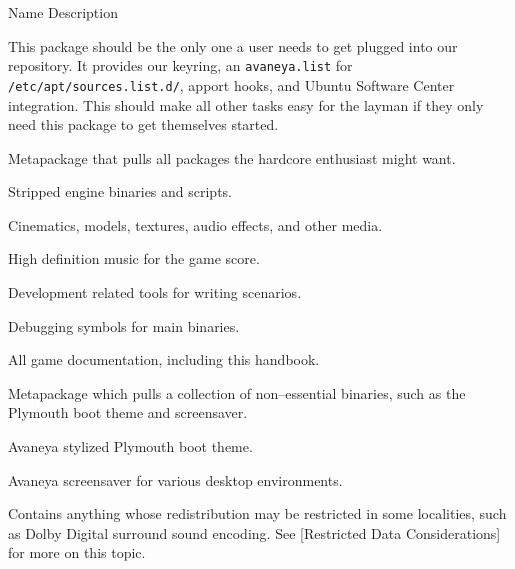 {
    \bTABLE[split=repeat,option=stretch]
    \setupTABLE[column][2]
        [width=.65\textwidth,
        align=yes]
    \setupTABLE[row][each][align=center]
    \setupTABLE[7][1][align=center]

\bTABLEhead
    \bTR[bottomframe=on]
      \bTH  Name \eTH
      \bTH  Description \eTH
    \eTR
\eTABLEhead

\bTABLEbody
    \bTR
       \eTC
      \bTC This package should be the only one a user needs to get plugged into our repository. It provides our keyring, an {\tt avaneya.list} for {\tt /etc/apt/sources.list.d/}, apport hooks, and Ubuntu Software Center integration. This should make all other tasks easy for the layman if they only need this package to get themselves started. \eTC
    \eTR

    \bTR
       \eTC
      \bTC Metapackage that pulls all packages the hardcore enthusiast might want. \eTC
    \eTR

    \bTR
       \eTC
      \bTC Stripped engine binaries and scripts. \eTC
    \eTR

    \bTR
       \eTC
      \bTC Cinematics, models, textures, audio effects, and other media. \eTC
    \eTR

    \bTR
       \eTC
      \bTC High definition music for the game score. \eTC
    \eTR

    \bTR
       \eTC
      \bTC Development related tools for writing scenarios. \eTC
    \eTR

    \bTR
       \eTC
      \bTC Debugging symbols for main binaries. \eTC
    \eTR

    \bTR
       \eTC
      \bTC All game documentation, including this handbook. \eTC
    \eTR

    \bTR
       \eTC
      \bTC Metapackage which pulls a collection of non--essential binaries, such as the Plymouth boot theme and screensaver. \eTC
    \eTR

    \bTR
       \eTC
      \bTC Avaneya stylized Plymouth boot theme. \eTC
    \eTR
    
    \bTR
       \eTC
      \bTC Avaneya screensaver for various desktop environments. \eTC
    \eTR

    \bTR
       \eTC
      \bTC Contains anything whose redistribution may be restricted in some localities, such as Dolby Digital surround sound encoding. See [Restricted Data Considerations] for more on this topic. \eTC
    \eTR
\eTABLEbody
\eTABLE
}


